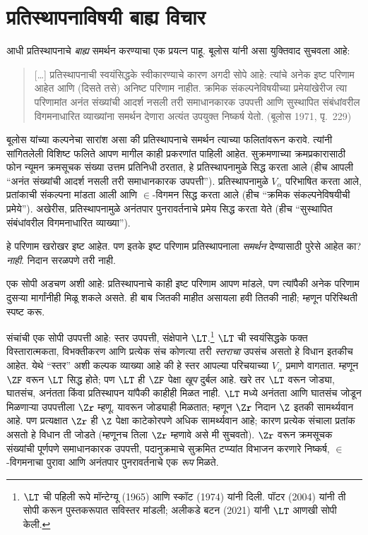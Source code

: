 \section{प्रतिस्थापनाविषयी बाह्य विचार}\label{sth:replacement:extrinsic:sec}

आधी प्रतिस्थापनाचे \emph{बाह्य} समर्थन करण्याचा एक प्रयत्न पाहू. बूलोस यांनी असा युक्तिवाद सुचवला आहे:
\begin{quote}
  [\ldots] प्रतिस्थापनाची स्वयंसिद्धके स्वीकारण्याचे कारण अगदी सोपे आहे: त्यांचे अनेक इष्ट परिणाम आहेत आणि (दिसते तसे) अनिष्ट परिणाम नाहीत. क्रमिक संकल्पनेविषयीच्या प्रमेयांखेरीज त्या परिणामांत अनंत संख्यांची आदर्श नसली तरी समाधानकारक उपपत्ती आणि सुस्थापित संबंधांवरील विगमनाधारित व्याख्यांना समर्थन देणारा अत्यंत उपयुक्त निष्कर्ष येतो.
  (बूलोस 1971, पृ.~229)
\end{quote}
बूलोस यांच्या कल्पनेचा सारांश असा की प्रतिस्थापनाचे समर्थन त्याच्या फलितांवरून करावे. त्यांनी सांगितलेली विशिष्ट फलिते आपण मागील काही प्रकरणांत पाहिली आहेत. सुक्रमणाच्या क्रमप्रकारासाठी फोन न्यूमन क्रमसूचक संख्या उत्तम प्रतिनिधी ठरतात, हे प्रतिस्थापनामुळे सिद्ध करता आले (हीच आपली ``अनंत संख्यांची आदर्श नसली तरी समाधानकारक उपपत्ती''). प्रतिस्थापनामुळे $V_\alpha$ परिभाषित करता आले, प्रतांकाची संकल्पना मांडता आली आणि $\in$-विगमन सिद्ध करता आले (हीच ``क्रमिक संकल्पनेविषयीची प्रमेये''). अखेरीस, प्रतिस्थापनामुळे अनंतपार पुनरावर्तनाचे प्रमेय सिद्ध करता येते (हीच ``सुस्थापित संबंधांवरील विगमनाधारित व्याख्या'').

हे परिणाम खरोखर इष्ट आहेत. पण इतके इष्ट परिणाम प्रतिस्थापनाला \emph{समर्थन} देण्यासाठी पुरेसे आहेत का? \emph{नाही}. निदान सरळपणे तरी नाही.

एक सोपी अडचण अशी आहे: प्रतिस्थापनाचे काही इष्ट परिणाम आपण मांडले, पण त्यांपैकी अनेक परिणाम दुसऱ्या मार्गांनीही मिळू शकले असते. ही बाब जितकी माहीत असायला हवी तितकी नाही; म्हणून परिस्थिती स्पष्ट करू.

संचांची एक सोपी उपपत्ती आहे: स्तर उपपत्ती, संक्षेपाने $\LT$.\footnote{$\LT$ ची पहिली रूपे मॉन्टेग्यू (1965) आणि स्कॉट (1974) यांनी दिली. पॉटर (2004) यांनी ती सोपी करून पुस्तकरूपात सविस्तर मांडली; अलीकडे बटन (2021) यांनी $\LT$ आणखी सोपी केली.} $\LT$ ची स्वयंसिद्धके फक्त विस्तारात्मकता, विभक्तीकरण आणि प्रत्येक संच कोणत्या तरी \emph{स्तराचा} उपसंच असतो हे विधान इतकीच आहेत. येथे ``स्तर'' अशी कल्पक व्याख्या आहे की हे स्तर आपल्या परिचयाच्या $V_\alpha$ प्रमाणे वागतात. म्हणून $\ZF$ वरून $\LT$ सिद्ध होते; पण $\LT$ ही $\ZF$ पेक्षा \emph{खूप} दुर्बल आहे. खरे तर $\LT$ वरून जोड्या, घातसंच, अनंतता किंवा प्रतिस्थापन यांपैकी काहीही मिळत नाही. $\LT$ मध्ये अनंतता आणि घातसंच जोडून मिळणाऱ्या उपपत्तीला $\Zr$ म्हणू. यावरून जोड्याही मिळतात; म्हणून $\Zr$ निदान $\Z$ इतकी सामर्थ्यवान आहे. पण प्रत्यक्षात $\Zr$ ही $\Z$ पेक्षा काटेकोरपणे अधिक सामर्थ्यवान आहे; कारण प्रत्येक संचाला प्रतांक असतो हे विधान ती जोडते (म्हणूनच तिला $\Zr$ म्हणावे असे मी सुचवतो). $\Zr$ वरून क्रमसूचक संख्यांची पूर्णपणे समाधानकारक उपपत्ती, पदानुक्रमाचे सुक्रमित टप्प्यांत विभाजन करणारे निष्कर्ष, $\in$-विगमनाचा पुरावा आणि अनंतपार पुनरावर्तनाचे एक \emph{रूप} मिळते.

